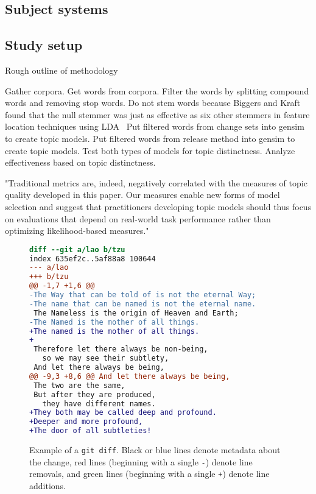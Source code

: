 
\subsection{Subject systems}


\subsection{Study setup}

Rough outline of methodology

Gather corpora.
Get words from corpora.
Filter the words by splitting compound words and removing stop words.
Do not stem words because Biggers and Kraft found that the null stemmer was just as effective as six other stemmers in feature location techniques using LDA~\cite{Biggers-Kraft:2012}
Put filtered words from change sets into gensim to create topic models.
Put filtered words from release method into gensim to create topic models.
Test both types of models for topic distinctness.
Analyze effectiveness based on topic distinctness.


"Traditional metrics are, indeed, negatively correlated with the
measures of topic quality developed in this paper.  Our measures enable
new forms of model selection and suggest that practitioners developing
topic models should thus focus on evaluations that depend on real-world
task performance rather than optimizing likelihood-based measures." ~\cite{Chang-etal:2009}

\begin{figure}[ht]
\centering
\footnotesize
\begin{lstlisting}[language=diff, basicstyle=\ttfamily]
diff --git a/lao b/tzu
index 635ef2c..5af88a8 100644
--- a/lao
+++ b/tzu
@@ -1,7 +1,6 @@
-The Way that can be told of is not the eternal Way;
-The name that can be named is not the eternal name.
 The Nameless is the origin of Heaven and Earth;
-The Named is the mother of all things.
+The named is the mother of all things.
+
 Therefore let there always be non-being,
   so we may see their subtlety,
 And let there always be being,
@@ -9,3 +8,6 @@ And let there always be being,
 The two are the same,
 But after they are produced,
   they have different names.
+They both may be called deep and profound.
+Deeper and more profound,
+The door of all subtleties!
\end{lstlisting}
\caption{Example of a \texttt{git diff}. Black or blue lines denote metadata about the change, red lines (beginning with a single \texttt{-}) denote line removals, and green lines (beginning with a single \texttt{+}) denote line additions.}
\label{fig:diff}
\end{figure}


